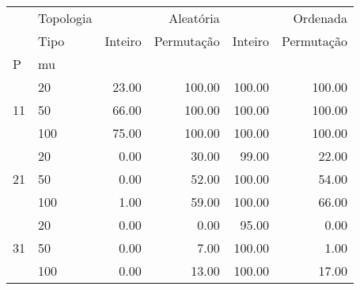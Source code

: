 \begin{tabular}{llrrrr}
\toprule
 & Topologia & \multicolumn{2}{r}{Aleatória} & \multicolumn{2}{r}{Ordenada} \\
 & Tipo & Inteiro & Permutação & Inteiro & Permutação \\
P & mu &  &  &  &  \\
\midrule
\multirow[t]{3}{*}{11} & 20 & 23.00 & 100.00 & 100.00 & 100.00 \\
 & 50 & 66.00 & 100.00 & 100.00 & 100.00 \\
 & 100 & 75.00 & 100.00 & 100.00 & 100.00 \\
\cline{1-6}
\multirow[t]{3}{*}{21} & 20 & 0.00 & 30.00 & 99.00 & 22.00 \\
 & 50 & 0.00 & 52.00 & 100.00 & 54.00 \\
 & 100 & 1.00 & 59.00 & 100.00 & 66.00 \\
\cline{1-6}
\multirow[t]{3}{*}{31} & 20 & 0.00 & 0.00 & 95.00 & 0.00 \\
 & 50 & 0.00 & 7.00 & 100.00 & 1.00 \\
 & 100 & 0.00 & 13.00 & 100.00 & 17.00 \\
\cline{1-6}
\bottomrule
\end{tabular}

